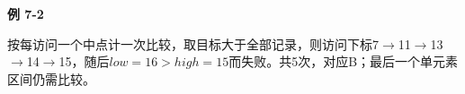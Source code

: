 {\color{ink}\bfseries 例 7-2}\par\vspace{1bp}按每访问一个中点计一次比较，取目标大于全部记录，则访问下标7\(\to \)11\(\to \)13\(\to \)14\(\to \)15，随后\(low=\allowbreak{}16>\allowbreak{}high=\allowbreak{}15\)而失败。共5次，对应B；最后一个单元素区间仍需比较。
